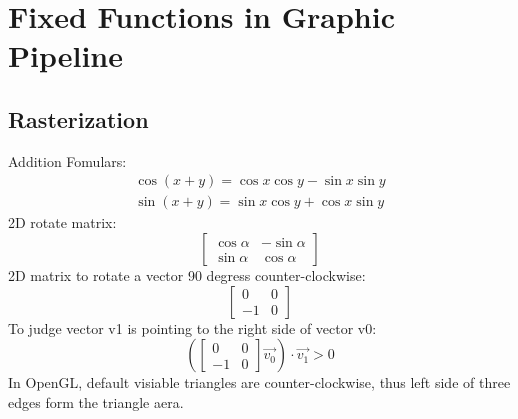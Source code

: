 \documentclass[12pt]{article}
\begin{document}
\section{Fixed Functions in Graphic Pipeline}
    \subsection{Rasterization}
        Addition Fomulars:
        \[ \begin{array}{c}
            \cos{ \left( x+y \right) }=\cos{x}\cos{y}-\sin{x}\sin{y} \\
            \sin{ \left( x+y \right) }=\sin{x}\cos{y}+\cos{x}\sin{y}
        \end{array} \]
        2D rotate matrix:
        \[ \left[ \begin{array}{rr}
            \cos{\alpha} & -\sin{\alpha} \\
            \sin{\alpha} & \cos{\alpha}
        \end{array} \right] \]
        2D matrix to rotate a vector 90 degress counter-clockwise:
        \[ \left[ \begin{array}{rr}
            0 & 0\\
            -1 & 0
        \end{array} \right] \]
        To judge vector v1 is pointing to the right side of vector v0:
        \[
        \left(
            \left[ \begin{array}{rr} 0 & 0\\ -1 & 0 \end{array} \right]
            \overrightarrow{v_0}
        \right)
        \cdot \overrightarrow{v_1} > 0
        \]
        In OpenGL, default visiable triangles are counter-clockwise, thus left side of 
        three edges form the triangle aera.
\end{document}
